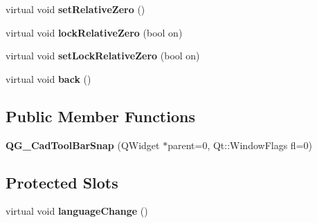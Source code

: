 \begin{DoxyCompactItemize}
\item 
\hypertarget{classQG__CadToolBarSnap_ae3ae2c4f363c542cf0ecea95356508d3}{virtual void {\bfseries set\-Relative\-Zero} ()}\label{classQG__CadToolBarSnap_ae3ae2c4f363c542cf0ecea95356508d3}

\item 
\hypertarget{classQG__CadToolBarSnap_acbf4dede1b4aa71b7db1dace0f60bdad}{virtual void {\bfseries lock\-Relative\-Zero} (bool on)}\label{classQG__CadToolBarSnap_acbf4dede1b4aa71b7db1dace0f60bdad}

\item 
\hypertarget{classQG__CadToolBarSnap_ab77945a90fb7eb010b49b7624cae4781}{virtual void {\bfseries set\-Lock\-Relative\-Zero} (bool on)}\label{classQG__CadToolBarSnap_ab77945a90fb7eb010b49b7624cae4781}

\item 
\hypertarget{classQG__CadToolBarSnap_acd398644da01230c8ca32471e0fb1518}{virtual void {\bfseries back} ()}\label{classQG__CadToolBarSnap_acd398644da01230c8ca32471e0fb1518}

\end{DoxyCompactItemize}
\subsection*{Public Member Functions}
\begin{DoxyCompactItemize}
\item 
\hypertarget{classQG__CadToolBarSnap_ab45ff80a01665f21a05b9c5a16832ae7}{{\bfseries Q\-G\-\_\-\-Cad\-Tool\-Bar\-Snap} (Q\-Widget $\ast$parent=0, Qt\-::\-Window\-Flags fl=0)}\label{classQG__CadToolBarSnap_ab45ff80a01665f21a05b9c5a16832ae7}

\end{DoxyCompactItemize}
\subsection*{Protected Slots}
\begin{DoxyCompactItemize}
\item 
\hypertarget{classQG__CadToolBarSnap_ac9a0edd48d9d946c6332a600f07c14d0}{virtual void {\bfseries language\-Change} ()}\label{classQG__CadToolBarSnap_ac9a0edd48d9d946c6332a600f07c14d0}

\end{DoxyCompactItemize}
